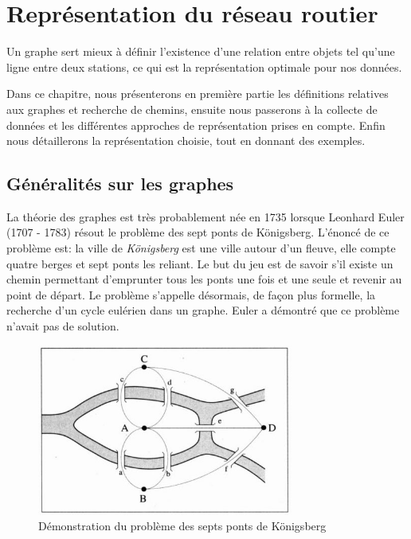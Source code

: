 \chapter{Représentation du réseau routier}
Un graphe sert mieux à définir l'existence d'une relation entre objets tel qu'une ligne entre deux stations, ce qui est la représentation optimale pour nos données. 

Dans ce chapitre, nous présenterons en première partie les définitions relatives aux graphes et recherche de chemins, ensuite nous passerons à la collecte de données et les différentes approches de représentation prises en compte.
Enfin nous détaillerons la représentation choisie, tout en donnant des exemples.

\section{Généralités sur les graphes}
La théorie des graphes est très probablement née en 1735 lorsque Leonhard Euler (1707 - 1783) résout le problème des sept ponts de Königsberg. 
L'énoncé de ce problème est: la ville de \emph{Königsberg} est une ville autour d'un fleuve, elle compte quatre berges et sept ponts les reliant. Le but du jeu est de savoir s'il existe un chemin permettant d'emprunter tous les ponts une fois et une seule et revenir au point de départ. Le problème s'appelle désormais, de façon plus formelle, la recherche d'un cycle eulérien dans un graphe. Euler a démontré que ce problème n'avait pas de solution.

\begin{figure}[h!]
\center
\includegraphics[width=0.75\textwidth]{img/Bridges.jpg}
\caption{Démonstration du problème des septs ponts de Königsberg}
\end{figure}

